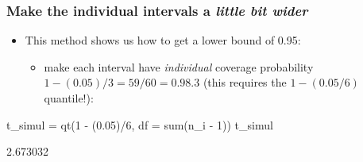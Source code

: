 \documentclass[a4paper]{article}\usepackage[]{graphicx}\usepackage[]{xcolor}
\begin{document}
\subsubsection{Make the individual intervals a \textit{little bit wider}}
\begin{itemize}
	\item This method shows us how to get a lower bound of 0.95:
	\begin{itemize}
		\item make each interval have \textit{individual} coverage probability \( 1-(0.05)/3=59/60=0.98.3 \) (this requires the \( 1-(0.05/6) \) quantile!):
	\end{itemize}
\end{itemize}
\begin{Schunk}
\begin{Sinput}
t_simul = qt(1 - (0.05)/6, df = sum(n_i - 1))
t_simul
\end{Sinput}
\begin{Soutput}
[1] 2.673032
\end{Soutput}
\end{Schunk}
\end{document}
